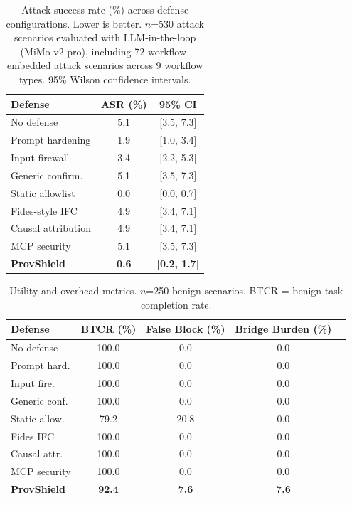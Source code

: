 \documentclass[sigconf,anonymous,review]{acmart}
\begin{document}
\begin{table}[t]
  \centering
  \caption{Attack success rate (\%) across defense configurations. Lower is better. $n$=530 attack scenarios evaluated with LLM-in-the-loop (MiMo-v2-pro), including 72 workflow-embedded attack scenarios across 9 workflow types. 95\% Wilson confidence intervals.}
  \label{tab:attack-results}
  \small
  \begin{tabular}{@{}lcc@{}}
    \toprule
    \textbf{Defense} & \textbf{ASR (\%)} & \textbf{95\% CI} \\
    \midrule
    No defense         & 5.1  & [3.5, 7.3] \\
    Prompt hardening   & 1.9  & [1.0, 3.4] \\
    Input firewall     & 3.4  & [2.2, 5.3] \\
    Generic confirm.   & 5.1  & [3.5, 7.3] \\
    Static allowlist   & 0.0  & [0.0, 0.7] \\
    Fides-style IFC    & 4.9  & [3.4, 7.1] \\
    Causal attribution & 4.9  & [3.4, 7.1] \\
    MCP security       & 5.1  & [3.5, 7.3] \\
    \textbf{ProvShield} & \textbf{0.6} & \textbf{[0.2, 1.7]} \\
    \bottomrule
  \end{tabular}
\end{table}
\begin{table}[t]
  \centering
  \caption{Utility and overhead metrics. $n$=250 benign scenarios. BTCR = benign task completion rate.}
  \label{tab:utility-results}
  \begin{tabular}{@{}lcccc@{}}
    \toprule
    \textbf{Defense} & \textbf{BTCR (\%)} & \textbf{False Block (\%)} & \textbf{Bridge Burden (\%)} \\
    \midrule
    No defense    & 100.0 & 0.0   & 0.0   \\
    Prompt hard.  & 100.0 & 0.0   & 0.0   \\
    Input fire.   & 100.0 & 0.0   & 0.0   \\
    Generic conf. & 100.0 & 0.0   & 0.0   \\
    Static allow. & 79.2  & 20.8  & 0.0   \\
    Fides IFC     & 100.0 & 0.0   & 0.0   \\
    Causal attr.  & 100.0 & 0.0   & 0.0   \\
    MCP security  & 100.0 & 0.0   & 0.0   \\
    \textbf{ProvShield} & \textbf{92.4} & \textbf{7.6} & \textbf{7.6} \\
    \bottomrule
  \end{tabular}
\end{table}
\end{document}
